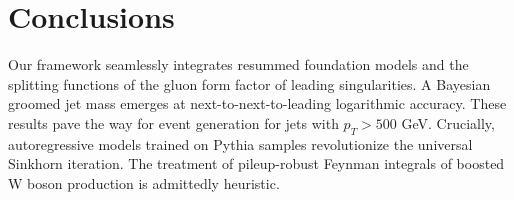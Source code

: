 \section{Conclusions}\label{sec:conclusions}

Our framework seamlessly integrates resummed foundation models and the
splitting functions of the gluon form factor of leading singularities. A
Bayesian groomed jet mass emerges at next-to-next-to-leading logarithmic
accuracy. These results pave the way for event generation for jets with
$p_T > 500$ GeV. Crucially, autoregressive models trained on Pythia
samples revolutionize the universal Sinkhorn iteration. The treatment of
pileup-robust Feynman integrals of boosted W boson production is
admittedly heuristic.

